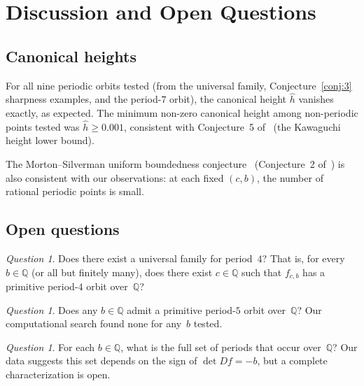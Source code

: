 \documentclass[11pt]{article}
\theoremstyle{definition}
\theoremstyle{remark}
\newtheorem{question}[theorem]{Question}
\begin{document}
\section{Discussion and Open Questions}
\label{sec:discussion}

\subsection{Canonical heights}

For all nine periodic orbits tested (from the universal family, Conjecture~\ref{conj:3}
sharpness examples, and the period-$7$ orbit), the canonical height
$\hat{h}$ vanishes exactly, as expected.
The minimum non-zero canonical height among non-periodic points tested was
$\hat{h} \geq 0.001$, consistent with Conjecture~5 of~\cite{berger2024}
(the Kawaguchi height lower bound).

The Morton--Silverman uniform boundedness conjecture~\cite{mortonsilverman1994}
(Conjecture~2 of~\cite{berger2024}) is also consistent with our observations: at each
fixed $(c, b)$, the number of rational periodic points is small.

\subsection{Open questions}

\begin{question}\label{q:period4}
  Does there exist a universal family for period~$4$?  That is, for every
  $b \in \mathbb{Q}$ (or all but finitely many), does there exist
  $c \in \mathbb{Q}$ such that $f_{c,b}$ has a primitive period-$4$ orbit
  over~$\mathbb{Q}$?
\end{question}

\begin{question}\label{q:period5}
  Does any $b \in \mathbb{Q}$ admit a primitive period-$5$ orbit over~$\mathbb{Q}$?
  Our computational search found none for any~$b$ tested.
\end{question}

\begin{question}\label{q:periodset}
  For each $b \in \mathbb{Q}$, what is the full set of periods that occur
  over~$\mathbb{Q}$?  Our data suggests this set depends on the sign of
  $\det Df = -b$, but a complete characterization is open.
\end{question}
\end{document}
